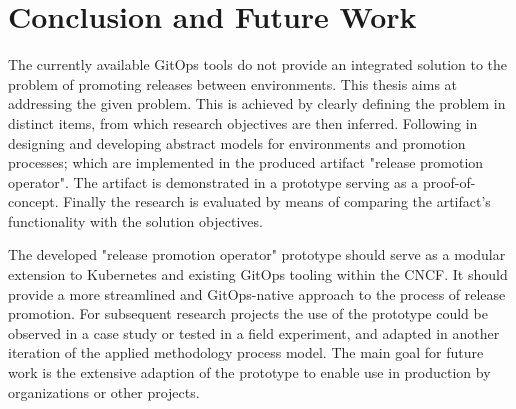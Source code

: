 \chapter{Conclusion and Future Work}

%
%
%
%

\noindent
The currently available GitOps tools
do not provide an integrated solution to
the problem of promoting releases between environments.
This thesis aims at addressing the given problem.
This is achieved by
clearly defining the problem in distinct items,
from which research objectives are then inferred.
Following in designing and developing abstract models for
environments and promotion processes;
which are implemented in the produced artifact "release promotion operator".
The artifact is demonstrated in a prototype serving as a proof-of-concept.
Finally the research is evaluated by means of
comparing the artifact's functionality with the solution objectives.
\bigskip

\noindent
The developed "release promotion operator" prototype should serve as
a modular extension to Kubernetes and existing GitOps tooling within the CNCF.
It should provide a more streamlined and GitOps-native approach
to the process of release promotion.
For subsequent research projects the use of the prototype could
be observed in a case study or tested in a field experiment,
and adapted in another iteration of the applied methodology process model.
The main goal for future work is the extensive adaption of the prototype
to enable use in production by organizations or other projects.





















